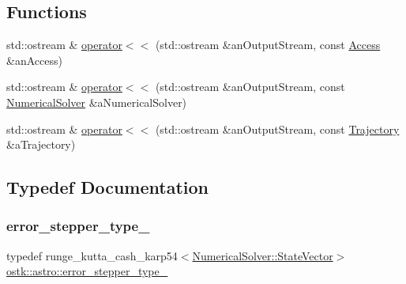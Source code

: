 \subsection*{Functions}
\begin{DoxyCompactItemize}
\item 
std\+::ostream \& \hyperlink{namespaceostk_1_1astro_ad6bf403749e98996e2e56cd6dc8cc848}{operator$<$$<$} (std\+::ostream \&an\+Output\+Stream, const \hyperlink{classostk_1_1astro_1_1_access}{Access} \&an\+Access)
\item 
std\+::ostream \& \hyperlink{namespaceostk_1_1astro_a1504859af3ff5ed6cea30697522bbf4e}{operator$<$$<$} (std\+::ostream \&an\+Output\+Stream, const \hyperlink{classostk_1_1astro_1_1_numerical_solver}{Numerical\+Solver} \&a\+Numerical\+Solver)
\item 
std\+::ostream \& \hyperlink{namespaceostk_1_1astro_a0cb767c3814a31416e0491406bc56ed2}{operator$<$$<$} (std\+::ostream \&an\+Output\+Stream, const \hyperlink{classostk_1_1astro_1_1_trajectory}{Trajectory} \&a\+Trajectory)
\end{DoxyCompactItemize}


\subsection{Typedef Documentation}
\mbox{\label{namespaceostk_1_1astro_ae0e87d949c5bf8265860957bc3e551a4}} 
\subsubsection{\texorpdfstring{error\+\_\+stepper\+\_\+type\+\_}{error\_stepper\_type\_54}}
{\footnotesize\ttfamily typedef runge\+\_\+kutta\+\_\+cash\+\_\+karp54$<$\hyperlink{classostk_1_1astro_1_1_numerical_solver_a4a1673a6f74a72d6bacfe6480b9c1ccd}{Numerical\+Solver\+::\+State\+Vector}$>$ \hyperlink{namespaceostk_1_1astro_ae0e87d949c5bf8265860957bc3e551a4}{ostk\+::astro\+::error\+\_\+stepper\+\_\+type\+\_}}

\mbox{\label{namespaceostk_1_1astro_ac65cff551d02047f499131307bd5f688}} 
